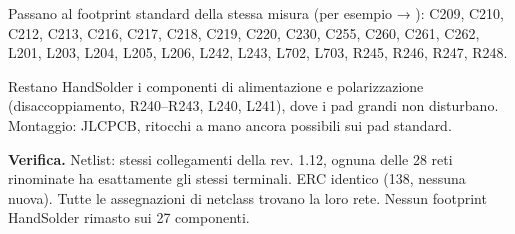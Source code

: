 Passano al footprint standard della stessa misura (per esempio  → ): C209, C210, C212, C213, C216, C217, C218, C219, C220, C230, C255, C260, C261, C262, L201, L203, L204, L205, L206, L242, L243, L702, L703, R245, R246, R247, R248.

Restano HandSolder i componenti di alimentazione e polarizzazione (disaccoppiamento, R240–R243, L240, L241), dove i pad grandi non disturbano. Montaggio: JLCPCB, ritocchi a mano ancora possibili sui pad standard.

\textbf{Verifica.} Netlist: stessi collegamenti della rev. 1.12, ognuna delle 28 reti rinominate ha esattamente gli stessi terminali. ERC identico (138, nessuna nuova). Tutte le assegnazioni di netclass trovano la loro rete. Nessun footprint HandSolder rimasto sui 27 componenti.
